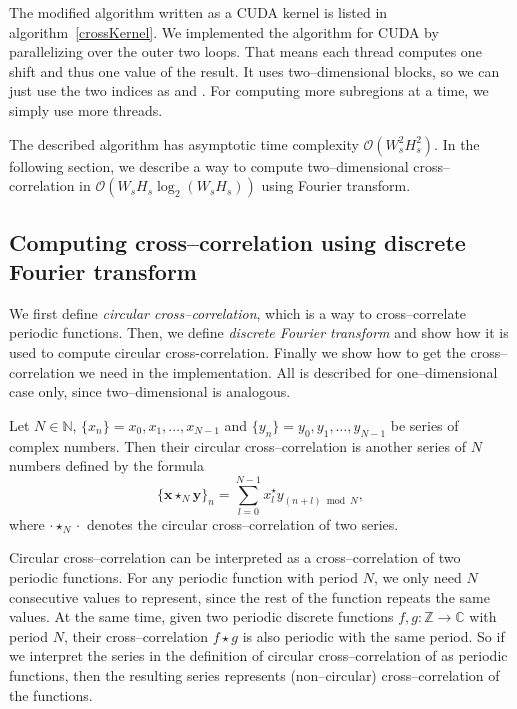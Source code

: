 The modified algorithm written as a CUDA kernel is listed in algorithm~\ref{crossKernel}. We implemented the algorithm for CUDA by parallelizing over the outer two loops. That means each thread computes one shift and thus one value of the result. It uses two--dimensional blocks, so we can just use the two indices as  and . For computing more subregions at a time, we simply use more threads.

The described algorithm has asymptotic time complexity $\mathcal{O}(W_s^2H_s^2)$. In the following section, we describe a way to compute two--dimensional cross--correlation in $\mathcal{O}(W_sH_s\log_2(W_sH_s))$ using Fourier transform.

\subsection{Computing cross--correlation using discrete Fourier transform}
\label{fft}

We first define \emph{circular cross--correlation}, which is a way to cross--correlate periodic functions. Then, we define \emph{discrete Fourier transform} and show how it is used to compute circular cross-correlation. Finally we show how to get the cross--correlation we need in the implementation. All is described for one--dimensional case only, since two--dimensional is analogous.

Let $N \in \mathbb{N}$, $\{x_n\} = x_0, x_1, \dots , x_{N-1}$ and $\{y_n\} = y_0, y_1, \dots , y_{N-1}$ be series of complex numbers. Then their circular cross--correlation is another series of $N$ numbers defined by the formula
\[
\{\mathbf{x} \star_N \mathbf{y}\}_n = \sum_{l=0}^{N-1}x^\star_ly_{(n+l)\bmod N},
\]
where $\cdot \star_N \cdot$ denotes the circular cross--correlation of two series.

Circular cross--correlation can be interpreted as a cross--correlation of two periodic functions. For any periodic function with period $N$, we only need $N$ consecutive values to represent, since the rest of the function repeats the same values. At the same time, given two periodic discrete functions $f, g : \mathbb{Z} \rightarrow \mathbb{C}$ with period $N$, their cross--correlation $f \star g$ is also periodic with the same period. So if we interpret the series in the definition of circular cross--correlation of as periodic functions, then the resulting series represents (non--circular) cross--correlation of the functions.

